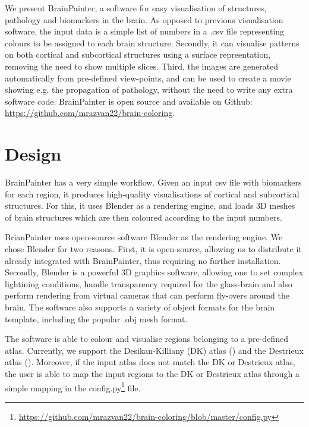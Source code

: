 \documentclass[final,times,twocolumn,authoryear]{elsarticle}
\begin{document}
We present BrainPainter, a software for easy visualisation of structures, pathology and biomarkers in the brain. As opposed to previous visualisation software, the input data is a simple list of numbers in a .csv file representing colours to be assigned to each brain structure. Secondly, it can visualise patterns on both cortical and subcortical structures using a surface repreentation, removing the need to show multiple slices. Third, the images are generated automatically from pre-defined view-points, and can be used to create a movie showing e.g. the propagation of pathology, without the need to write any extra software code. BrainPainter is open source and available on Github: \url{https://github.com/mrazvan22/brain-coloring}.



\section{Design}
\label{design}



BrainPainter has a very simple workflow. Given an input csv file with biomarkers for each region, it produces high-quality visualisations of cortical and subcortical structures. For this, it uses Blender as a rendering engine, and loads 3D meshes of brain structures which are then coloured according to the input numbers.

BrianPainter uses open-source software Blender as the rendering engine. We chose Blender for two reasons. First, it is open-source, allowing us to distribute it already integrated with BrainPainter, thus requiring no further installation. Secondly, Blender is a powerful 3D graphics software, allowing one to set complex lightining conditions, handle transparency required for the glass-brain and also perform rendering from virtual cameras that can perform fly-overs around the brain. The software also supports a variety of object formats for the brain template, including the popular .obj mesh format.

The software is able to colour and visualise regions belonging to a pre-defined atlas. Currently, we support the Desikan-Killiany (DK) atlas (\cite{desikan2006automated}) and the Destrieux atlas (\cite{destrieux2010automatic}). Moreover, if the input atlas does not match the DK or Destrieux atlas, the user is able to map the input regions to the DK or Destrieux atlas through a simple mapping in the config.py\footnote{\url{https://github.com/mrazvan22/brain-coloring/blob/master/config.py}} file. 
\end{document}
